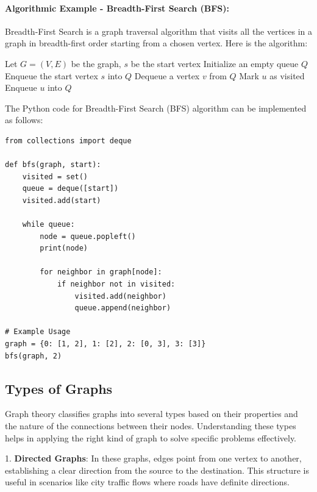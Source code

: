 \documentclass[12pt]{book} %
\begin{document}
\paragraph{Algorithmic Example - Breadth-First Search (BFS):}
Breadth-First Search is a graph traversal algorithm that visits all the vertices in a graph in breadth-first order starting from a chosen vertex. Here is the algorithm:

\begin{algorithm}
\caption{Breadth-First Search (BFS)}
\begin{algorithmic}
\State Let $G = (V, E)$ be the graph, $s$ be the start vertex
\State Initialize an empty queue $Q$
\State Enqueue the start vertex $s$ into $Q$
    \State Dequeue a vertex $v$ from $Q$
            \State Mark $u$ as visited
            \State Enqueue $u$ into $Q$
        \EndIf
    \EndFor
\EndWhile
\end{algorithmic}
\end{algorithm}

The Python code for Breadth-First Search (BFS) algorithm can be implemented as follows:

\begin{lstlisting}
from collections import deque

def bfs(graph, start):
    visited = set()
    queue = deque([start])
    visited.add(start)

    while queue:
        node = queue.popleft()
        print(node)

        for neighbor in graph[node]:
            if neighbor not in visited:
                visited.add(neighbor)
                queue.append(neighbor)

# Example Usage
graph = {0: [1, 2], 1: [2], 2: [0, 3], 3: [3]}
bfs(graph, 2)
\end{lstlisting}

\subsection{Types of Graphs}

Graph theory classifies graphs into several types based on their properties and the nature of the connections between their nodes. Understanding these types helps in applying the right kind of graph to solve specific problems effectively.

1. \textbf{Directed Graphs}: In these graphs, edges point from one vertex to another, establishing a clear direction from the source to the destination. This structure is useful in scenarios like city traffic flows where roads have definite directions.
\end{document}
